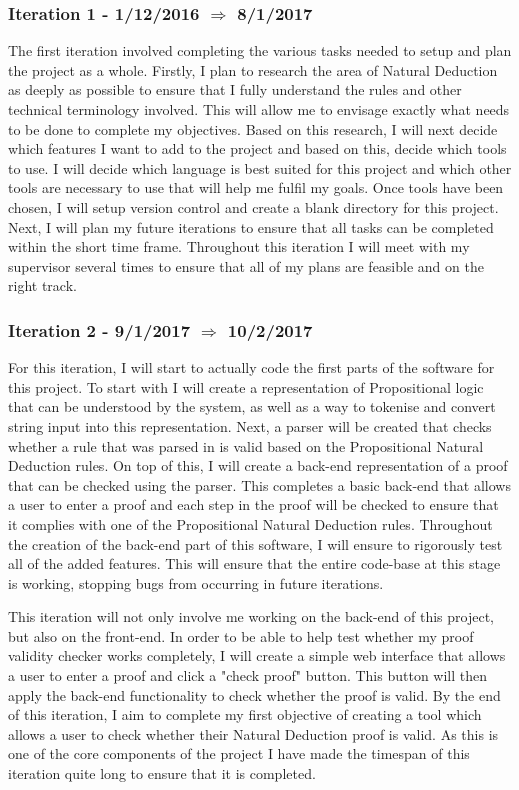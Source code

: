 \subsubsection{Iteration 1 - 1/12/2016 $\Rightarrow$ 8/1/2017}

The first iteration involved completing the various tasks needed to setup and plan the project as a whole. Firstly, I plan to research the area of Natural Deduction as deeply as possible to ensure that I fully understand the rules and other technical terminology involved. This will allow me to envisage exactly what needs to be done to complete my objectives. Based on this research, I will next decide which features I want to add to the project and based on this, decide which tools to use. I will decide which language is best suited for this project and which other tools are necessary to use that will help me fulfil my goals. Once tools have been chosen, I will setup version control and create a blank directory for this project. Next, I will plan my future iterations to ensure that all tasks can be completed within the short time frame. Throughout this iteration I will meet with my supervisor several times to ensure that all of my plans are feasible and on the right track.

\subsubsection{Iteration 2 - 9/1/2017 $\Rightarrow$ 10/2/2017}

For this iteration, I will start to actually code the first parts of the software for this project. To start with I will create a representation of Propositional logic that can be understood by the system, as well as a way to tokenise and convert string input into this representation. Next, a parser will be created that checks whether a rule that was parsed in is valid based on the Propositional Natural Deduction rules. On top of this, I will create a back-end representation of a proof that can be checked using the parser. This completes a basic back-end that allows a user to enter a proof and each step in the proof will be checked to ensure that it complies with one of the Propositional Natural Deduction rules. Throughout the creation of the back-end part of this software, I will ensure to rigorously test all of the added features. This will ensure that the entire code-base at this stage is working, stopping bugs from occurring in future iterations. 

This iteration will not only involve me working on the back-end of this project, but also on the front-end. In order to be able to help test whether my proof validity checker works completely, I will create a simple web interface that allows a user to enter a proof and click a "check proof" button. This button will then apply the back-end functionality to check whether the proof is valid. By the end of this iteration, I aim to complete my first objective of creating a tool which allows a user to check whether their Natural Deduction proof is valid. As this is one of the core components of the project I have made the timespan of this iteration quite long to ensure that it is completed.


